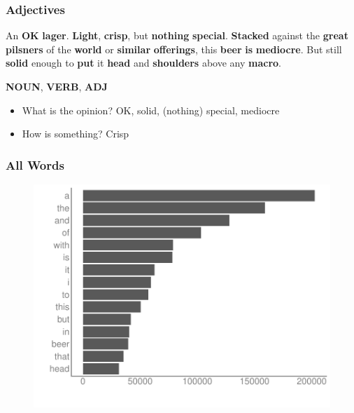 \begin{frame}
    \frametitle{\textcolor{isegreen}{Adjectives}}
\begin{spacing}{1.6}
    An \textbf{\textcolor{isegreen}{OK}} \textbf{\textcolor{isered}{lager}}. \textbf{\textcolor{isered}{Light}}, \textbf{\textcolor{isegreen}{crisp}}, but \textbf{\textcolor{isered}{nothing}} \textbf{\textcolor{isegreen}{special}}. \textbf{\textcolor{iseblue}{Stacked}} against the \textbf{\textcolor{isegreen}{great}} \textbf{\textcolor{isered}{pilsners}} of the \textbf{\textcolor{isered}{world}} or \textbf{\textcolor{isegreen}{similar}} \textbf{\textcolor{isered}{offerings}}, this \textbf{\textcolor{isered}{beer}} \textbf{\textcolor{iseblue}{is}} \textbf{\textcolor{isegreen}{mediocre}}. But still \textbf{\textcolor{isegreen}{solid}} enough to \textbf{\textcolor{iseblue}{put}} it \textbf{\textcolor{isered}{head}} and \textbf{\textcolor{isered}{shoulders}} above any \textbf{\textcolor{isered}{macro}}.
\end{spacing}

\vspace{-10pt}
\begin{flushright}
    \textbf{\textcolor{isered}{NOUN}}, \textbf{\textcolor{iseblue}{VERB}}, \textbf{\textcolor{isegreen}{ADJ}}
\end{flushright}

\begin{itemize}
\item What is the opinion? OK, solid, (nothing) special, mediocre
\item How is something? Crisp
\end{itemize}
\end{frame}



\begin{frame}
    \frametitle{All Words}
\begin{figure}[htb]
\includegraphics[scale=0.55,left]{img/figures/bar_words}
\end{figure}
\end{frame}

